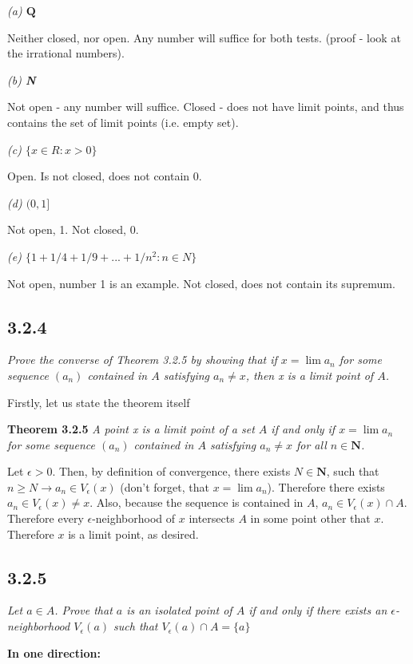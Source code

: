 \documentclass[11pt,oneside,titlepage]{book}
\begin{document}
\textit{(a) $\textbf{Q}$}

Neither closed, nor open. Any number will suffice for both tests.
(proof - look at the irrational numbers).

\textit{(b) \textbf{N}}

Not open - any number will suffice. Closed - does not have limit points, and
thus contains the set of limit points (i.e. empty set).

\textit{(c) $\{x \in R: x > 0\}$}

Open. Is not closed, does not contain 0.

\textit{(d) $(0,1]$}

Not open, 1. Not closed, 0.

\textit{(e) $\{1 + 1/4 + 1/9 + ... + 1/n^2: n \in N\}$}

Not open, number 1 is an example. Not closed, does not contain its supremum.


\subsection*{3.2.4}
\textit{Prove the converse of Theorem 3.2.5 by showing that if
  $x = \lim a_n$ for some sequence $(a_n)$ contained in $A$ satisfying
  $a_n \neq x$, then x is a limit point of $A$.}

Firstly, let us state the theorem itself

\textbf{Theorem 3.2.5}
\textit{A point x is a limit point of a set $A$ if and only if $x = \lim a_n$
  for some sequence $(a_n)$ contained in $A$ satisfying $a_n \neq x$ for all
  $n \in \textbf{N}$.}

Let  $\epsilon > 0$. Then, by definition of convergence, there
exists $N \in \textbf{N}$, such that $n \geq N \to a_n \in V_\epsilon(x)$
(don't forget, that $x = \lim a_n$). Therefore there exists
$a_n \in V_\epsilon(x) \neq x $. Also, because the sequence is contained in
$A$, $a_n \in V_\epsilon(x) \cap A$.  Therefore every $\epsilon$-neighborhood
of $x$ intersects  $A$ in some point other that $x$. Therefore $x$ is a limit
point, as desired.

\subsection*{3.2.5}
\textit{Let $a \in A$. Prove that $a$ is an isolated point of $A$ if and only
  if there exists an $\epsilon$-neighborhood $V_\epsilon(a)$ such that
  $V_\epsilon(a) \cap A = \{a\}$ }

\textbf{In one direction:}
\end{document}
